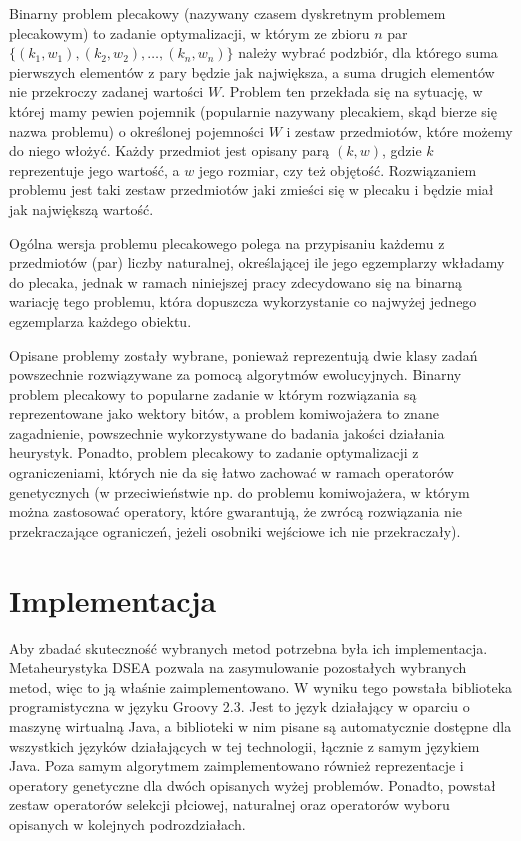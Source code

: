 \documentclass[./FM_mgr.tex]{subfiles}
\begin{document}
Binarny problem plecakowy (nazywany czasem dyskretnym problemem plecakowym) to zadanie optymalizacji, w którym ze zbioru $n$ par $\{ (k_1, w_1),  (k_2, w_2), \ldots, (k_n, w_n)\}$ należy wybrać podzbiór, dla którego suma pierwszych elementów z pary będzie jak największa, a suma drugich elementów nie przekroczy zadanej wartości $W$.
Problem ten przekłada się na sytuację, w której mamy pewien pojemnik (popularnie nazywany plecakiem, skąd bierze się nazwa problemu) o określonej pojemności $W$ i zestaw przedmiotów, które możemy do niego włożyć. 
Każdy przedmiot jest opisany parą $(k, w)$, gdzie $k$ reprezentuje jego wartość, a $w$ jego rozmiar, czy też objętość. 
Rozwiązaniem problemu jest taki zestaw przedmiotów jaki zmieści się w plecaku i będzie miał jak największą wartość. 

Ogólna wersja problemu plecakowego polega na przypisaniu każdemu z przedmiotów (par) liczby naturalnej, określającej ile jego egzemplarzy wkładamy do plecaka, jednak w ramach niniejszej pracy zdecydowano się na binarną wariację tego problemu, która dopuszcza wykorzystanie co najwyżej jednego egzemplarza każdego obiektu.

Opisane problemy zostały wybrane, ponieważ reprezentują dwie klasy zadań powszechnie rozwiązywane za pomocą algorytmów ewolucyjnych. 
Binarny problem plecakowy to popularne zadanie w którym rozwiązania są reprezentowane jako wektory bitów, a problem komiwojażera to znane zagadnienie, powszechnie wykorzystywane do badania jakości działania heurystyk. 
Ponadto, problem plecakowy to zadanie optymalizacji z ograniczeniami, których nie da się łatwo zachować w ramach operatorów genetycznych (w przeciwieństwie np. do problemu komiwojażera, w którym można zastosować operatory, które gwarantują, że zwrócą rozwiązania nie przekraczające ograniczeń, jeżeli osobniki wejściowe ich nie przekraczały).

\section{Implementacja}

Aby zbadać skuteczność wybranych metod potrzebna była ich implementacja.
Metaheurystyka DSEA pozwala na zasymulowanie pozostałych wybranych metod, więc to ją właśnie zaimplementowano.
W wyniku tego powstała biblioteka programistyczna w języku Groovy 2.3. Jest to język działający w oparciu o maszynę wirtualną Java, a biblioteki w nim pisane są automatycznie dostępne dla wszystkich języków działających w tej technologii, łącznie z samym językiem Java.
Poza samym algorytmem zaimplementowano również reprezentacje i operatory genetyczne dla dwóch opisanych wyżej problemów.
Ponadto, powstał zestaw operatorów selekcji płciowej, naturalnej oraz operatorów wyboru opisanych w kolejnych podrozdziałach.
\end{document}
